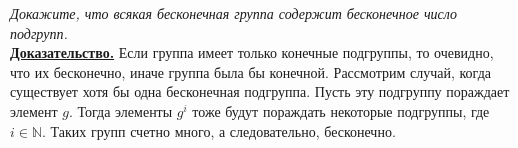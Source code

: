 \documentclass[14pt,a4paper]{scrartcl}
\begin{document}
\begin{spacing}{1}
\begin{center}
\end{center}
\textit{Докажите, что всякая бесконечная группа содержит бесконечное число подгрупп.}\\
\textbf{\underline{Доказательство.}} Если группа имеет только конечные подгруппы, то очевидно, что их бесконечно, иначе группа была бы конечной. Рассмотрим случай, когда существует хотя бы одна бесконечная подгруппа. Пусть эту подгруппу пораждает элемент $g$. Тогда элементы $g^i$ тоже будут пораждать некоторые подгруппы, где $i \in \mathbb{N}$. Таких групп счетно много, а следовательно, бесконечно.
\end{spacing}
\end{document}

